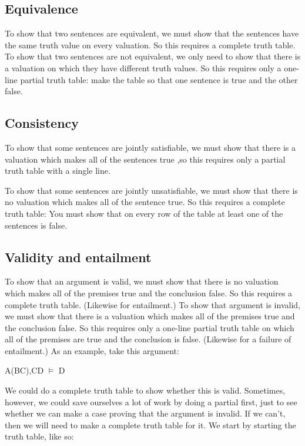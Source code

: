 \subsection{Equivalence}

To show that two sentences are equivalent, we must show that the sentences have the same truth value on every valuation. So this requires a complete truth table. To show that two sentences are not equivalent, we only need to show that there is a valuation on which they have different truth values. So this requires only a one-line partial truth table: make the table so that one sentence is true and the other false.

\subsection{Consistency}

To show that some sentences are jointly satisfiable, we must show that there is a valuation which makes all of the sentences true ,so this requires only a partial truth table with a single line.

To show that some sentences are jointly unsatisfiable, we must show that there is no valuation which makes all of the sentence true. So this requires a complete truth table: You must show that on every row of the table at least one of the sentences is false.

\subsection{Validity and entailment}

To show that an argument is valid, we must show that there is no valuation which makes all of the premises true and the conclusion false. So this requires a complete truth table. (Likewise for entailment.) To show that argument is invalid, we must show that there is a valuation which makes all of the premises true and the conclusion false. So this requires only a one-line partial truth table on which all of the premises are true and the conclusion is false. (Likewise for a failure of entailment.) As an example, take this argument:

\begin{center}
A\eif(B\eor C),C\eif D $\vDash$ D
\end{center}

We could do a complete truth table to show whether this is valid. Sometimes, however, we could save ourselves a lot of work by doing a partial first, just to see whether we can make a case proving that the argument is invalid. If we can't, then we will need to make a complete truth table for it. We start by starting the truth table, like so:

